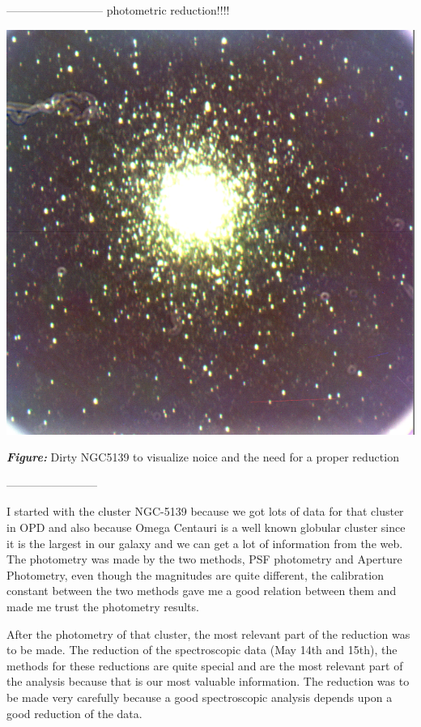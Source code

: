 \documentclass[english]{article}
\begin{document}
--------------------------
photometric reduction!!!!

\begin{center}
\includegraphics[scale=0.5]{ngc_5139_dirty.png}

\textit{\textbf{Figure:}} Dirty NGC5139 to visualize noice and the need for a proper reduction
\end{center}
------------------------

I started with the cluster NGC-5139 because we got lots of data for that cluster in OPD and also because Omega Centauri is a well known globular cluster since it is the largest in our galaxy and we can get a lot of information from the web. The photometry was made by the two methods, PSF photometry and Aperture Photometry, even though the magnitudes are quite different, the calibration constant between the two methods gave me a good relation between them and made me trust the photometry results.

After the photometry of that cluster, the most relevant part of the reduction was to be made. The reduction of the spectroscopic data (May 14th and 15th), the methods for these reductions are quite special and are the most relevant part of the analysis because that is our most valuable information. The reduction was to be made very carefully because a good spectroscopic analysis depends upon a good reduction of the data. 
\end{document}
